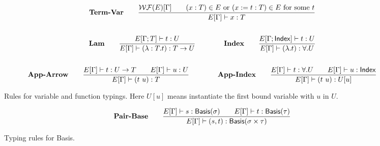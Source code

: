 \documentclass{article}
\begin{document}
\begin{figure}[h]
    \begin{gather*}
        \textbf{Term-Var} \qquad
        \frac{\mathcal{WF}(E)[\Gamma] \qquad (x:T) \in E \text{ or } (x := t : T) \in E \text{ for some $t$}}{E[\Gamma] \vdash x : T} \\
        \\
        \textbf{Lam} \qquad
        \frac{E[\Gamma; T] \vdash t : U}{E[\Gamma] \vdash (\lambda : T . t) : T \to U}
        \qquad \qquad
        \textbf{Index} \qquad
        \frac{E[\Gamma; \mathsf{Index}] \vdash t : U}{E[\Gamma] \vdash (\lambda.t) : \forall .U} \\
        \\
        \textbf{App-Arrow} \qquad
        \frac{E[\Gamma] \vdash t:U \to T \qquad E[\Gamma] \vdash u:U}{E[\Gamma] \vdash (t\ u):T}
        \qquad \qquad
        \textbf{App-Index} \qquad
        \frac{E[\Gamma] \vdash t:\forall .U \qquad E[\Gamma] \vdash u : \mathsf{Index}}{E[\Gamma] \vdash (t\ u):U[u]}
    \end{gather*}
    \caption{Rules for variable and function typings. Here $U[u]$ means instantiate the first bound variable with $u$ in $U$.}
\end{figure}


\begin{figure}[h]
    \begin{gather*}
        \textbf{Pair-Base} \qquad
        \frac{
            E[\Gamma]\vdash s : \mathsf{Basis}(\sigma) \qquad E[\Gamma]\vdash t : \mathsf{Basis}(\tau)} {E[\Gamma]\vdash (s, t) : \mathsf{Basis}(\sigma \times \tau)} 
        \textbf{}
    \end{gather*}
    \caption{Typing rules for Basis. }
\end{figure}
\end{document}
